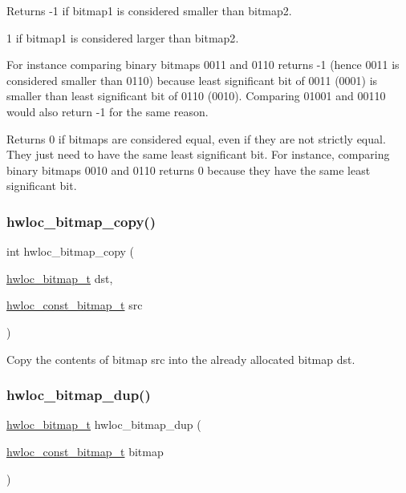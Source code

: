 \begin{DoxyReturn}{Returns}
-\/1 if {\ttfamily bitmap1} is considered smaller than {\ttfamily bitmap2}. 

1 if {\ttfamily bitmap1} is considered larger than {\ttfamily bitmap2}.
\end{DoxyReturn}
For instance comparing binary bitmaps 0011 and 0110 returns -\/1 (hence 0011 is considered smaller than 0110) because least significant bit of 0011 (0001) is smaller than least significant bit of 0110 (0010). Comparing 01001 and 00110 would also return -\/1 for the same reason.

\begin{DoxyReturn}{Returns}
0 if bitmaps are considered equal, even if they are not strictly equal. They just need to have the same least significant bit. For instance, comparing binary bitmaps 0010 and 0110 returns 0 because they have the same least significant bit. 
\end{DoxyReturn}
\mbox{\label{a00205_ga72a29824798b48784b8217471ec8f14c}} 
\subsubsection{\texorpdfstring{hwloc\+\_\+bitmap\+\_\+copy()}{hwloc\_bitmap\_copy()}}
{\footnotesize\ttfamily int hwloc\+\_\+bitmap\+\_\+copy (\begin{DoxyParamCaption}\item[{\hyperlink{a00205_gaa3c2bf4c776d603dcebbb61b0c923d84}{hwloc\+\_\+bitmap\+\_\+t}}]{dst,  }\item[{\hyperlink{a00205_gae991a108af01d408be2776c5b2c467b2}{hwloc\+\_\+const\+\_\+bitmap\+\_\+t}}]{src }\end{DoxyParamCaption})}



Copy the contents of bitmap {\ttfamily src} into the already allocated bitmap {\ttfamily dst}. 

\mbox{\label{a00205_gae679434c1a5f41d3560a8a7e2c1b0dee}} 
\subsubsection{\texorpdfstring{hwloc\+\_\+bitmap\+\_\+dup()}{hwloc\_bitmap\_dup()}}
{\footnotesize\ttfamily \hyperlink{a00205_gaa3c2bf4c776d603dcebbb61b0c923d84}{hwloc\+\_\+bitmap\+\_\+t} hwloc\+\_\+bitmap\+\_\+dup (\begin{DoxyParamCaption}\item[{\hyperlink{a00205_gae991a108af01d408be2776c5b2c467b2}{hwloc\+\_\+const\+\_\+bitmap\+\_\+t}}]{bitmap }\end{DoxyParamCaption})}



